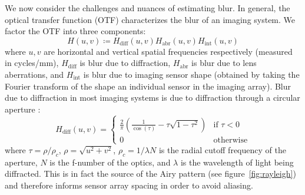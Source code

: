 We now consider the challenges and nuances of estimating blur.
%
In general, the optical transfer function (OTF) characterizes the blur of an imaging system.
%
We factor the OTF into three components:
\begin{equation}
	H(u, v) \coloneqq H_{\text{diff}}(u,v) H_{\text{abr}}(u,v) H_{\text{int}} (u,v)
\end{equation}
where \(u,v\) are horizontal and vertical spatial frequencies respectively (measured in cycles/mm), \(H_{\text{diff}}\) is blur due to diffraction, \(H_{\text{abr}}\) is blur due to lens aberrations, and \(H_{\text{int}}\) is blur due to imaging sensor shape (obtained by taking the Fourier transform of the shape an individual sensor in the imaging array).
%
Blur due to diffraction in most imaging systems is due to diffraction through a circular aperture \cite{goodman2005introduction}:
\begin{equation*}
	H_{\text{diff}}(u,v) =   \begin{cases}
		\frac{2}{\pi} \left(\frac{1}{\cos(\tau)} - \tau \sqrt{1-\tau^2}\right) & \text{if } \tau < 0 \\
		0                                                                      & \text{otherwise}
	\end{cases}
\end{equation*}
where \(\tau = \rho/\rho_c\), \(\rho=\sqrt{u^2 +v^2}\), \(\rho_c = 1/\lambda N\) is the radial cutoff frequency of the aperture, \(N\) is the f-number of the optics, and \(\lambda\) is the wavelength of light being diffracted.
%
This is in fact the source of the Airy pattern (see figure~\ref{fig:rayleigh}) and therefore informs sensor array spacing in order to avoid aliasing.

